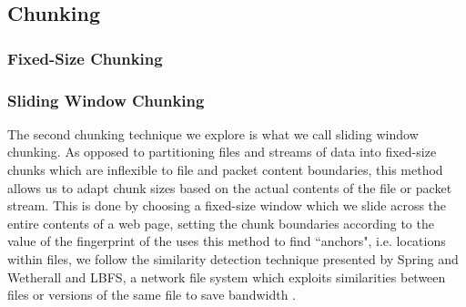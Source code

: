 \subsection{Chunking}
\label{sec:chunking}
\subsubsection{Fixed-Size Chunking}

\subsubsection{Sliding Window Chunking}
The second chunking technique we explore is what we call sliding window chunking. As opposed to partitioning files and streams of data into fixed-size chunks which are inflexible to file and packet content boundaries, this method allows us to adapt chunk sizes based on the actual contents of the file or packet stream. This is done by choosing a fixed-size window which we slide across the entire contents of a web page, setting the chunk boundaries according to the value of the fingerprint of the uses this method to find ``anchors", i.e. locations within files, we follow the similarity detection technique presented by Spring and Wetherall \cite{spring} and LBFS, a network file system which exploits similarities between files or versions of the same file to save bandwidth \cite{lbfs}.
